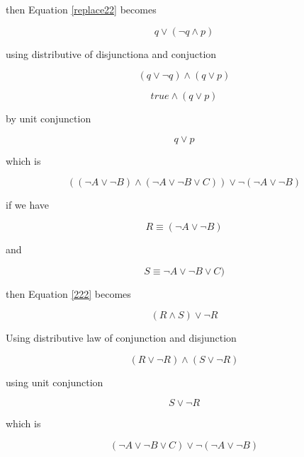 \documentclass[10pt,a4paper]{article}
\begin{document}
then Equation \ref{replace22} becomes

\begin{equation}
 q \vee (\neg q \wedge p)
\end{equation}

using distributive of disjunctiona and conjuction

\begin{equation}
 (q \vee \neg q)\wedge (q\vee p)
\end{equation}


\begin{equation}
 true \wedge (q\vee p)
\end{equation}

by unit conjunction

\begin{equation}
 q\vee p
\end{equation}

which is 

\begin{equation}
 ((\neg A \vee \neg B) \wedge(\neg A\vee\neg B\vee C)) \vee \neg(\neg A\vee \neg B)
\label{222}
\end{equation}

if we have

\begin{equation}
 R \equiv (\neg A \vee \neg B)
\end{equation}

and

\begin{equation}
 S \equiv \neg A\vee\neg B\vee C)
\end{equation}

then Equation \ref{222} becomes

\begin{equation}
 (R \wedge S) \vee \neg R
\end{equation}

Using distributive law of conjunction and disjunction

\begin{equation}
 (R \vee \neg R) \wedge (S\vee \neg R) 
\end{equation}

using unit conjunction 

\begin{equation}
 S \vee \neg R
\end{equation}

which is 

\begin{equation}
(\neg A\vee\neg B\vee C) \vee \neg(\neg A \vee \neg B)
\end{equation}
\end{document}
